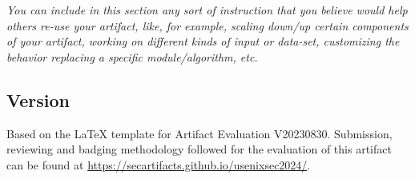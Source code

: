 \textit{You can include in this section any sort of instruction that you believe
would help others re-use your artifact, like, for example, scaling down/up
certain components of your artifact, working on different kinds of input or
data-set, customizing the behavior replacing a specific module/algorithm, etc.}


\subsection{Version}
Based on the LaTeX template for Artifact Evaluation V20230830. Submission,
reviewing and badging methodology followed for the evaluation of this artifact
can be found at \url{https://secartifacts.github.io/usenixsec2024/}.